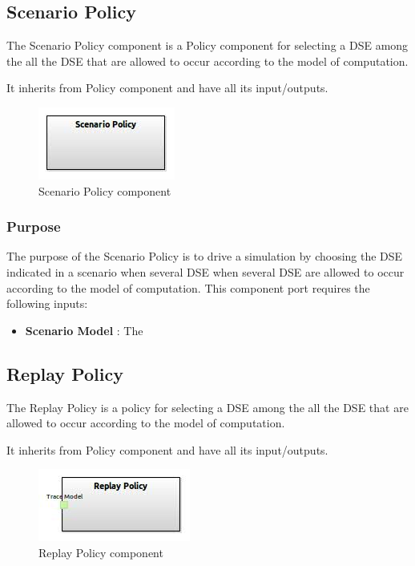 \documentclass{gemoc} %
\begin{document}
\subsection{Scenario Policy}
The Scenario Policy component is a Policy component for selecting a DSE among the all the DSE that are allowed to occur according to the model of computation.

It inherits from Policy component and have all its input/outputs.
\begin{figure}[htp]
	\begin{center}
	\includegraphics*[trim=0.0cm 0.0cm 0cm 0.0cm, clip=true, scale=1.0]{../images/generated/Generated_Scenario Policy.jpg}
	\caption{Scenario Policy component}
	\end{center}
\end{figure}

\subsubsection{Purpose}
The purpose of the Scenario Policy is to drive a simulation by choosing the DSE indicated in a scenario when several DSE when several DSE are allowed to occur according to the model of computation.
This component port requires the following inputs:
\begin{itemize}
  \item \textbf{Scenario Model} :
The 
\end{itemize}


\subsection{Replay Policy}
The Replay Policy is a policy for selecting a DSE among the all the DSE that are allowed to occur according to the model of computation.

It inherits from Policy component and have all its input/outputs.
\begin{figure}[htp]
	\begin{center}
	\includegraphics*[trim=0.0cm 0.0cm 0cm 0.0cm, clip=true, scale=1.0]{../images/generated/Generated_Replay Policy.jpg}
	\caption{Replay Policy component}
	\end{center}
\end{figure}
\end{document}
